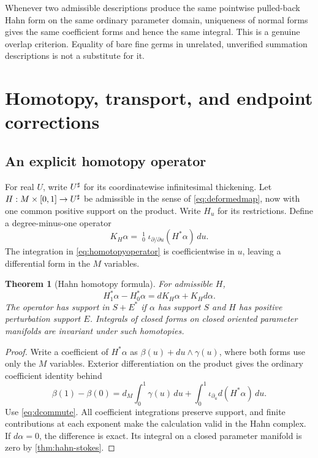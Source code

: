 \documentclass[11pt,letterpaper]{article}
\newtheorem{theorem}{Theorem}[section]
\theoremstyle{definition}
\theoremstyle{remark}
\newcommand{\HInt}{\mathop{\int^{\!H}}\nolimits}\newcommand{\HCoint}{\mathop{\oint^{\!H}}\nolimits}
\numberwithin{equation}{section}
\begin{document}
Whenever two admissible descriptions produce the same pointwise pulled-back Hahn form on the same ordinary parameter domain, uniqueness of normal forms gives the same coefficient forms and hence the same integral. This is a genuine overlap criterion. Equality of bare fine germs in unrelated, unverified summation descriptions is not a substitute for it.

\section{Homotopy, transport, and endpoint corrections}\label{sec:homotopy}
\subsection{An explicit homotopy operator}
For real $U$, write $U^{\sharp}$ for its coordinatewise infinitesimal thickening. Let $H:M\times[0,1]\to U^{\sharp}$ be admissible in the sense of \eqref{eq:deformedmap}, now with one common positive support on the product. Write $H_u$ for its restrictions. Define a degree-minus-one operator
\begin{equation}\label{eq:homotopyoperator}
 K_H\alpha=\HInt_0^1\iota_{\partial/\partial u}(H^*\alpha)\,du.
\end{equation}
The integration in \eqref{eq:homotopyoperator} is coefficientwise in $u$, leaving a differential form in the $M$ variables.

\begin{theorem}[Hahn homotopy formula]\label{thm:homotopy}
For admissible $H$,
\begin{equation}\label{eq:homotopyformula}
 H_1^*\alpha-H_0^*\alpha=dK_H\alpha+K_Hd\alpha.
\end{equation}
The operator has support in $S+E^*$ if $\alpha$ has support $S$ and $H$ has positive perturbation support $E$. Integrals of closed forms on closed oriented parameter manifolds are invariant under such homotopies.
\end{theorem}
\begin{proof}
Write a coefficient of $H^*\alpha$ as $\beta(u)+du\wedge\gamma(u)$, where both forms use only the $M$ variables. Exterior differentiation on the product gives the ordinary coefficient identity behind
\[
 \beta(1)-\beta(0)
 =d_M\int_0^1\gamma(u)\,du
   +\int_0^1\iota_{\partial_u}d(H^*\alpha)\,du.
\]
Use \eqref{eq:dcommute}. All coefficient integrations preserve support, and finite contributions at each exponent make the calculation valid in the Hahn complex. If $d\alpha=0$, the difference is exact. Its integral on a closed parameter manifold is zero by \cref{thm:hahn-stokes}.
\end{proof}
\end{document}
